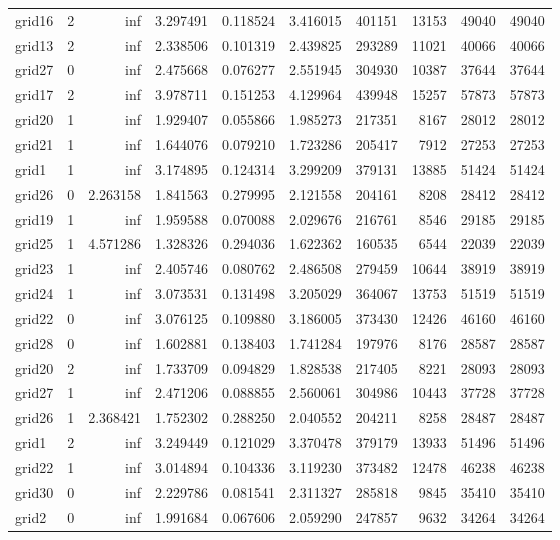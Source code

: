 \documentclass[../../../thesis.tex]{subfiles}
\begin{document}
\begin{longtable}{|l|r|r|r|r|r|r|r|r|r|}
grid16 & 2 & inf & 3.297491 & 0.118524 & 3.416015 & 401151 & 13153 & 49040 & 49040 \\
grid13 & 2 & inf & 2.338506 & 0.101319 & 2.439825 & 293289 & 11021 & 40066 & 40066 \\
grid27 & 0 & inf & 2.475668 & 0.076277 & 2.551945 & 304930 & 10387 & 37644 & 37644 \\
grid17 & 2 & inf & 3.978711 & 0.151253 & 4.129964 & 439948 & 15257 & 57873 & 57873 \\
grid20 & 1 & inf & 1.929407 & 0.055866 & 1.985273 & 217351 & 8167 & 28012 & 28012 \\
grid21 & 1 & inf & 1.644076 & 0.079210 & 1.723286 & 205417 & 7912 & 27253 & 27253 \\
grid1 & 1 & inf & 3.174895 & 0.124314 & 3.299209 & 379131 & 13885 & 51424 & 51424 \\
grid26 & 0 & 2.263158 & 1.841563 & 0.279995 & 2.121558 & 204161 & 8208 & 28412 & 28412 \\
grid19 & 1 & inf & 1.959588 & 0.070088 & 2.029676 & 216761 & 8546 & 29185 & 29185 \\
grid25 & 1 & 4.571286 & 1.328326 & 0.294036 & 1.622362 & 160535 & 6544 & 22039 & 22039 \\
grid23 & 1 & inf & 2.405746 & 0.080762 & 2.486508 & 279459 & 10644 & 38919 & 38919 \\
grid24 & 1 & inf & 3.073531 & 0.131498 & 3.205029 & 364067 & 13753 & 51519 & 51519 \\
grid22 & 0 & inf & 3.076125 & 0.109880 & 3.186005 & 373430 & 12426 & 46160 & 46160 \\
grid28 & 0 & inf & 1.602881 & 0.138403 & 1.741284 & 197976 & 8176 & 28587 & 28587 \\
grid20 & 2 & inf & 1.733709 & 0.094829 & 1.828538 & 217405 & 8221 & 28093 & 28093 \\
grid27 & 1 & inf & 2.471206 & 0.088855 & 2.560061 & 304986 & 10443 & 37728 & 37728 \\
grid26 & 1 & 2.368421 & 1.752302 & 0.288250 & 2.040552 & 204211 & 8258 & 28487 & 28487 \\
grid1 & 2 & inf & 3.249449 & 0.121029 & 3.370478 & 379179 & 13933 & 51496 & 51496 \\
grid22 & 1 & inf & 3.014894 & 0.104336 & 3.119230 & 373482 & 12478 & 46238 & 46238 \\
grid30 & 0 & inf & 2.229786 & 0.081541 & 2.311327 & 285818 & 9845 & 35410 & 35410 \\
grid2 & 0 & inf & 1.991684 & 0.067606 & 2.059290 & 247857 & 9632 & 34264 & 34264 \\

\end{longtable}
\end{document}
